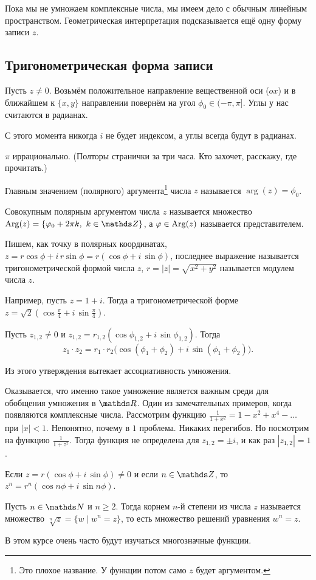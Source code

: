Пока мы не умножаем комплексные числа, мы имеем дело с обычным линейным пространством. Геометрическая интерпретация подсказывается ещё одну форму записи $z$.
\subsection{Тригонометрическая форма записи}
Пусть $z\ne 0$. Возьмём положительное направление вещественной оси ($ox$) и в ближайшем к $\{x,y\}$ направлении повернём на угол $\phi_0\in(-\pi,\pi]$. Углы у нас считаются в радианах.

С этого момента никогда $i$ не будет индексом, а углы всегда будут в радианах.
\begin{Task}
	$\pi$ иррационально. (Полторы странички за три часа. Кто захочет, расскажу, где прочитать.)
\end{Task}
\begin{Def}
	Главным значением (полярного) аргумента\footnote{Это плохое название. У функции потом само $z$ будет аргументом.} числа $z$ называется $\arg(z) = \phi_0$.

	Совокупным полярным аргументом числа $z$ называется множество $\Arg(z) = \{\phi_0+2\pi k,\ k\in \Z\}$, а $\varphi\in \operatorname{Arg}(z)$ называется представителем.
\end{Def}
Пишем, как точку в полярных координатах, $z = r \cos\phi + i\, r\sin \phi = r(\cos\phi + i\, \sin\phi)$, последнее выражение называется тригонометрической формой числа $z$, $r = |z| = \sqrt{x^2+y^2}$ называется модулем числа $z$.

Например, пусть $z = 1+ i$. Тогда а тригонометрической форме $z = \sqrt{2}\left(\cos\frac\pi4 + i\, \sin\frac\pi 4\right)$.
\begin{Ut}
	Пусть $z_{1,2}\ne0$ и $z_{1,2} = r_{1,2}(\cos\phi_{1,2} + i\,\sin\phi_{1,2})$. Тогда 
	\[
		z_1\cdot z_2 = r_1\cdot r_2 \big(\cos(\phi_1+\phi_2) + i\,\sin(\phi_1+\phi_2)\big).
	\]
\end{Ut}
Из этого утверждения вытекает ассоциативность умножения.

Оказывается, что именно такое умножение является важным среди для обобщения умножения в $\R$. Один из замечательных примеров, когда появляются комплексные числа. Рассмотрим функцию $\frac1{1+x^2} = 1-x^2+x^4 - \dots$ при $|x|<1$. Непонятно, почему в $1$ проблема. Никаких перегибов. Но посмотрим на функцию $\frac1{1+z^2}$. Тогда функция не определена для $z_{1,2} = \pm i$, и как раз $|z_{1,2}| = 1$.
\begin{Sl}
	Если $z = r(\cos\phi + i\, \sin \phi)\ne 0$ и если $n\in\Z$, то $z^n = r^n(\cos n\phi + i\,\sin n\phi)$.
\end{Sl}
\begin{Def}
	Пусть $n\in\N$ и $n\ge 2$. Тогда корнем $n$-й степени из числа $z$ называется множество $\sqrt[n]z = \{w\mid w^n =z\}$, то есть множество решений уравнения $w^n=z$.
\end{Def}
В этом курсе очень часто будут изучаться многозначные функции.

